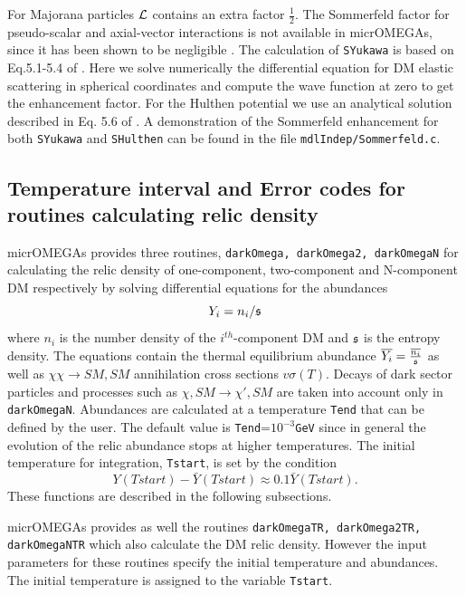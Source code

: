 \documentclass[12pt,a4paper]{article}
\begin{document}
For Majorana particles ${\cal L}$  contains an extra factor $\frac{1}{2}$.  
The Sommerfeld factor for  pseudo-scalar  and axial-vector   interactions is not available in micrOMEGAs, since it has been shown to be negligible  \cite{Agrawal:2020lea}. 
 The calculation of {\tt SYukawa} is based on Eq.5.1-5.4 of \cite{Iengo_2009}.  Here we solve numerically the differential equation for DM elastic scattering in spherical coordinates  and compute the wave function at zero to get the enhancement factor. For the  Hulthen potential we use an analytical solution described in  Eq. 5.6 of \cite{Slatyer:2009vg} . %
A  demonstration of the Sommerfeld enhancement for both {\tt SYukawa}  and {\tt  SHulthen} can be found  in the file {\tt mdlIndep/Sommerfeld.c}.


\subsection{Temperature interval and  Error codes for routines calculating relic density} 
micrOMEGAs provides  three routines, { \tt darkOmega, darkOmega2, darkOmegaN} 
 for calculating the relic density of one-component, two-component and N-component DM respectively by solving 
differential equations for the abundances 
\begin{equation}
  Y_i=n_i/{\mathfrak{s}} 
  \end{equation}
where $n_i$ is the number density of the $i^{th}$-component  DM and ${\mathfrak{s}}$ is the entropy density. 
The equations
contain the  thermal equilibrium  abundance $\overline{Y_i}=\frac{\overline{n_i}}{{\mathfrak{s}}}$ as well as $\chi\chi\to SM,SM$
annihilation cross sections $v\sigma(T)$. Decays of dark sector particles and processes such as  $
\chi, SM\to \chi', SM$ are taken into account only in {\tt darkOmegaN}. Abundances are calculated   at a temperature {\tt Tend} that can be defined  by the user. The default value is 
{\tt Tend}=$10^{-3}${\tt GeV} since in general the  evolution of the relic abundance stops at higher
temperatures. The initial temperature for integration, {\tt Tstart}, is set  by the
condition 
$$ Y(Tstart)-\bar{Y}(Tstart) \approx 0.1 \bar{Y}(Tstart). $$
These functions are described in the following subsections.

micrOMEGAs provides as well the routines
{ \tt darkOmegaTR, darkOmega2TR, darkOmegaNTR}  which also calculate the  DM relic
density. However the input parameters for these routines specify
the  initial temperature and  abundances. The initial temperature is assigned to the
variable {\tt Tstart}. 
\end{document}

